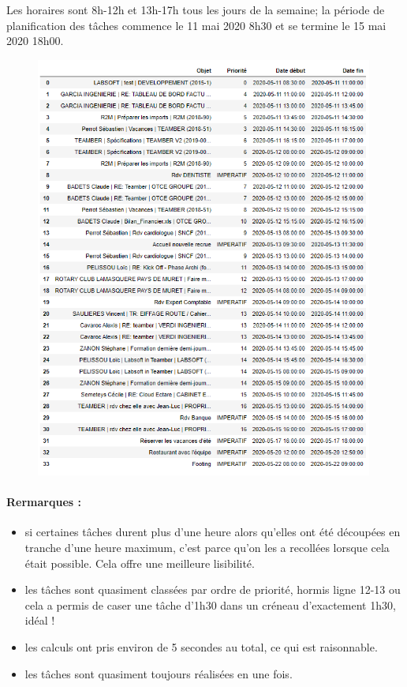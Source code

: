\documentclass[12pt]{article}
\begin{document}
\newpage	
Les horaires sont 8h-12h et 13h-17h tous les jours de la semaine; la période de planification des tâches commence le 11 mai 2020 8h30 et se termine le 15 mai 2020 18h00.
\begin{figure}[H]
\begin{center}
\includegraphics[width=0.99\textwidth]{oedt2}
\end{center}
\end{figure}

\newpage
\paragraph{Rermarques :}
\begin{itemize}
\item si certaines tâches durent plus d'une heure alors qu'elles ont été découpées en tranche d'une heure maximum, c'est parce qu'on les a recollées lorsque cela était possible. Cela offre une meilleure lisibilité.
\item les tâches sont quasiment classées par ordre de priorité, hormis ligne 12-13 ou cela a permis de caser une tâche d'1h30 dans un créneau d'exactement 1h30, idéal !
\item les calculs ont pris environ de 5 secondes au total, ce qui est raisonnable.
\item les tâches sont quasiment toujours réalisées en une fois.\\
\end{itemize}
\end{document}
